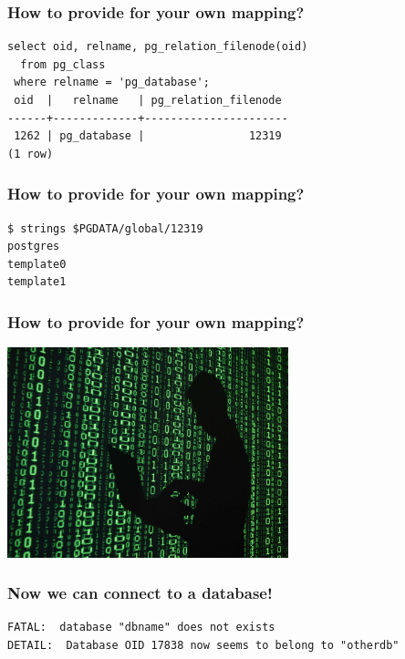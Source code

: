 \documentclass{beamer}
\begin{document}
\begin{frame}[fragile]
  \frametitle{How to provide for your own mapping?}

  \begin{verbatim}
select oid, relname, pg_relation_filenode(oid)
  from pg_class
 where relname = 'pg_database';
 oid  |   relname   | pg_relation_filenode 
------+-------------+----------------------
 1262 | pg_database |                12319
(1 row)
  \end{verbatim}  
\end{frame}

\begin{frame}[fragile]
  \frametitle{How to provide for your own mapping?}

  \begin{verbatim}
$ strings $PGDATA/global/12319
postgres
template0
template1
  \end{verbatim}  
\end{frame}

\begin{frame}
  \frametitle{How to provide for your own mapping?}
  
  \vfill
  
  \begin{center}
    \includegraphics[height=2.4in]{Hacker-2.jpg}
  \end{center}
\end{frame}

\begin{frame}[fragile]
  \frametitle{Now we can connect to a database!}
  
  \vfill

  \begin{verbatim}
FATAL:  database "dbname" does not exists
DETAIL:  Database OID 17838 now seems to belong to "otherdb"
  \end{verbatim}  
\end{frame}
\end{document}
